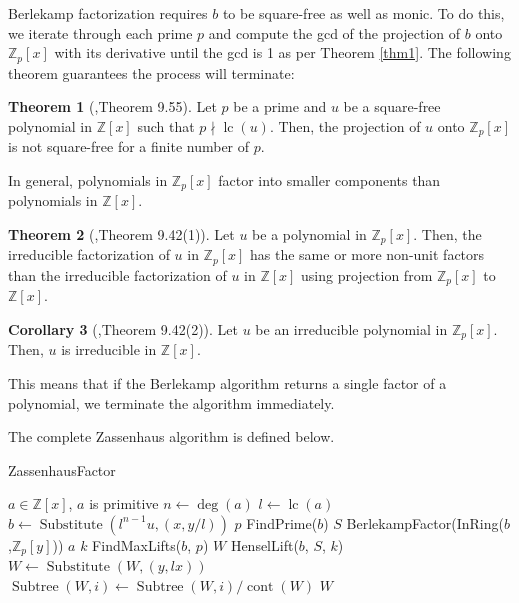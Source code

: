 \documentclass{article}
\theoremstyle{definition}
\newtheorem{thm}{Theorem}[section]
\newtheorem{corollary}[thm]{Corollary}
\DeclareMathOperator{\subs}{Substitute}
\DeclareMathOperator{\subtree}{Subtree}
\DeclareMathOperator{\args}{Args}
\DeclareMathOperator{\lc}{lc}
\DeclareMathOperator{\cont}{cont}
\begin{document}
Berlekamp factorization requires $b$ to be square-free as well as monic. To do this, we iterate through each prime $p$ and compute the gcd of the projection of $b$ onto $\mathbb{Z}_p[x]$ with its derivative until the gcd is 1 as per Theorem \ref{thm1}. The following theorem guarantees the process will terminate:

\begin{thm} [\cite{casc1},Theorem 9.55]
    Let $p$ be a prime and $u$ be a square-free polynomial in $\mathbb{Z}[x]$ such that $p \nmid \lc(u)$. Then, the projection of $u$ onto $\mathbb{Z}_p[x]$ is not square-free for a finite number of $p$.
\end{thm}

In general, polynomials in $\mathbb{Z}_p[x]$ factor into smaller components than polynomials in $\mathbb{Z}[x]$.

\begin{thm} [\cite{casc1},Theorem 9.42(1)]
    Let $u$ be a polynomial in $\mathbb{Z}_p[x]$. Then, the irreducible factorization of $u$ in $\mathbb{Z}_p[x]$ has the same or more non-unit factors than the irreducible factorization of $u$ in $\mathbb{Z}[x]$ using projection from $\mathbb{Z}_p[x]$ to $\mathbb{Z}[x]$.
\end{thm}

\begin{corollary}[\cite{casc1},Theorem 9.42(2)]
     Let $u$ be an irreducible polynomial in $\mathbb{Z}_p[x]$. Then, $u$ is irreducible in $\mathbb{Z}[x]$.
\end{corollary}

This means that if the Berlekamp algorithm returns a single factor of a polynomial, we terminate the algorithm immediately.

The complete Zassenhaus algorithm is defined below.

    \begin{algorithm}\small
    \caption{ZassenhausFactor \cite{zf}}
        \begin{algorithmic}[1]
            \Require $a \in \mathbb{Z}[x]$, $a$ is primitive
            \State $n \gets \deg(a)$
            \State $l \gets \lc(a)$
            \State $b \gets \subs(l^{n-1}u, (x, y/l))$
            \State $p$ \gets FindPrime($b$)
            \State $S$ \gets BerlekampFactor(InRing($b$,$\mathbb{Z}_p[y]$))
            \If{$\args(S) = 1$}
                \State \Return $a$
            \EndIf
            \State $k$ \gets FindMaxLifts($b$, $p$)
            \State $W$ \gets HenselLift($b$, $S$, $k$)
            \State $W \gets \subs(W, (y, lx))$
            \For{$i \in \{1, \ldots, \args(W)\}$}
                \State $\subtree(W, i) \gets \subtree(W, i)/\cont(W)$
            \EndFor
            \State \Return $W$
        \end{algorithmic}
    \end{algorithm}
    
\end{document}
